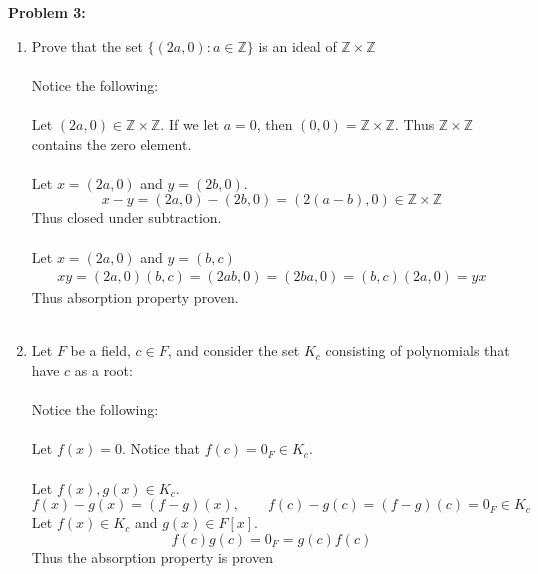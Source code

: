 \documentclass[12pt]{article}
\begin{document}
\noindent \textbf{Problem 3: }
	\begin{enumerate}[label = (\alph*)]
		\item Prove that the set $\{(2a,0) : a \in \mathbb{Z}\}$ is an ideal of $\mathbb{Z} \times \mathbb{Z}$
		\\ \\
		Notice the following: 
			\\ \\
			Let $(2a, 0) \in \mathbb{Z} \times \mathbb{Z}$.  If we let $a = 0$, then $(0,0) = \mathbb{Z} \times \mathbb{Z}$.  Thus $\mathbb{Z} \times \mathbb{Z}$ contains the zero element. 
			\\ \\
			Let $x = (2a,0)$ and $y = (2b, 0)$.
				$$
				x - y = (2a,0) - (2b,0) = (2(a-b),0) \in \mathbb{Z} \times \mathbb{Z}
				$$
			Thus closed under subtraction.
			\\ \\
			Let $x = (2a , 0)$ and $y = (b, c)$
				\begin{align*}
					xy = (2a, 0)(b,c) = (2ab,0) = (2ba,0) = (b,c)(2a,0) = yx
				\end{align*}
			Thus absorption property proven.
			\\ \\
		\item Let $F$ be a field, $c \in F$, and consider the set $K_c$ consisting of polynomials that have $c$
		as a root:
		\\ \\
		Notice the following:
			\\ \\
			Let $f(x) = 0$.  Notice that $f(c) = 0_F \in K_c$.
			\\ \\
			Let $f(x), g(x) \in K_c$. 
				$$
				f(x) - g(x) = (f-g)(x), \qquad f(c) - g(c) = (f-g)(c) = 0_F \in K_c
				$$
			Let $f(x) \in K_c$ and $g(x) \in F[x]$.
				$$
				f(c)g(c) = 0_F = g(c)f(c)
				$$
			Thus the absorption property is proven
	\end{enumerate}
\end{document}
